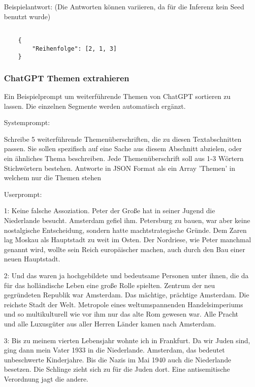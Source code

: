 Beispielantwort:
(Die Antworten können variieren, da für die Inferenz kein Seed benutzt wurde)

\begin{verbatim}

    {
        "Reihenfolge": [2, 1, 3]
    }

\end{verbatim}



\label{ch:chatgpt-topics}
\subsubsection*{ChatGPT Themen extrahieren}

Ein Beispielprompt um weiterführende Themen von ChatGPT sortieren zu lassen.
Die einzelnen Segmente werden automatisch ergänzt.

Systemprompt:
\begin{itshape}
    Schreibe 5 weiterführende Themenüberschriften, die zu diesen Textabschnitten passen.
    Sie sollen spezifisch auf eine Sache aus diesem Abschnitt abzielen, oder ein ähnliches Thema beschreiben. 
    Jede Themenüberschrift soll aus 1-3 Wörtern Stichwörtern bestehen.
    Antworte in JSON Format als ein Array 'Themen' in welchem nur die Themen stehen 
\end{itshape}

Userprompt:

\begin{itshape}
    1: Keine falsche Assoziation. Peter der Große hat in seiner Jugend die Niederlande besucht. Amsterdam gefiel ihm. Petersburg zu bauen, war aber keine nostalgische Entscheidung, sondern hatte machtstrategische Gründe. Dem Zaren lag Moskau als Hauptstadt zu weit im Osten. Der Nordriese, wie Peter manchmal genannt wird, wollte sein Reich europäischer machen, auch durch den Bau einer neuen Hauptstadt.
    
    2: Und das waren ja hochgebildete und bedeutsame Personen unter ihnen, die da für das holländische Leben eine große Rolle spielten. Zentrum der neu gegründeten Republik war Amsterdam. Das mächtige, prächtige Amsterdam. Die reichste Stadt der Welt. Metropole eines weltumspannenden Handelsimperiums und so multikulturell wie vor ihm nur das alte Rom gewesen war. Alle Pracht und alle Luxusgüter aus aller Herren Länder kamen nach Amsterdam.
    
    3: Bis zu meinem vierten Lebensjahr wohnte ich in Frankfurt. Da wir Juden sind, ging dann mein Vater 1933 in die Niederlande. Amsterdam, das bedeutet unbeschwerte Kinderjahre. Bis die Nazis im Mai 1940 auch die Niederlande besetzen. Die Schlinge zieht sich zu für die Juden dort. Eine antisemitische Verordnung jagt die andere.
\end{itshape}

